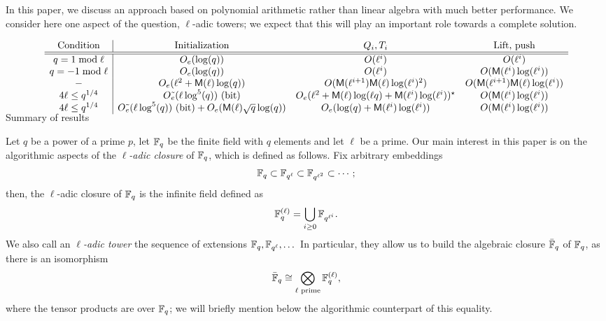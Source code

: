\documentclass{sig-alternate}
\begin{document}
In this paper, we discuss an approach based on polynomial arithmetic
rather than linear algebra with much better performance. We consider
here one aspect of the question, $\ell$-adic towers; we expect that
this will play an important role towards a complete solution.

\begin{table*}[!t]
$$
\begin{array}{c|cccc}
  \text{Condition} & \text{Initialization} & Q_i, T_i & \text{Lift, push}\\
  \hline \hline
  q = 1 \bmod \ell & O_e(\log(q))  & O(\ell^i) & O(\ell^i) \\
  q = -1 \bmod \ell & O_e(\log(q)) & O(\ell^i) & O(\Mult(\ell^i) \log(\ell^i)) \\
  - & O_e (\ell^2+\Mult(\ell) \log(q)) & O(\Mult(\ell^{i+1})\Mult(\ell)\log(\ell^i)^2) & O( \Mult(\ell^{i+1})\Mult(\ell)\log(\ell^i))\\
  4\ell \le q^{1/4} & O\tilde{_e}(\ell\log^5(q)) \text{~(bit)}  & O_e(\ell^2+\Mult(\ell)\log(\ell
  q)+\Mult(\ell^i)\log(\ell^i))^\star & O(\Mult(\ell^i) \log(\ell^i)) \\
  4\ell \le q^{1/4} & O\tilde{_e}(\ell\log^5(q))  \text{~(bit)}  + O_e(\Mult(\ell)\sqrt{q}\log(q)) & O_e(\log(q) + \Mult(\ell^i) \log(\ell^i)) & O(\Mult(\ell^i) \log(\ell^i)) \vspace{-0.5cm}
\end{array}
$$
\label{table:main}
\caption{Summary of results}
\end{table*}

Let $q$ be a power of a prime $p$, let $\mathbb{F}_q$ be the finite field with
$q$ elements and let $\ell$ be a prime. Our main interest in this
paper is on the algorithmic aspects of the \emph{$\ell$-adic closure}
of $\mathbb{F}_q$, which is defined as follows. Fix arbitrary embeddings
\begin{equation*}
  \mathbb{F}_q \subset \mathbb{F}_{q^\ell} \subset \mathbb{F}_{q^{\ell^2}} \subset \cdots;
\end{equation*}
then, the $\ell$-adic closure of $\mathbb{F}_q$ is the infinite field defined as
\begin{equation*}
  \mathbb{F}_q^{(\ell)} = \bigcup_{i\ge 0}\mathbb{F}_{q^{\ell^i}}.
\end{equation*}
We also call an \emph{$\ell$-adic tower} the sequence of extensions
$\mathbb{F}_q,\mathbb{F}_{q^\ell},\dots$ In particular, they allow us to build the
algebraic closure $\bar{\mathbb{F}}_q$ of $\mathbb{F}_q$, as there is an isomorphism
\begin{equation}
  \label{eq:tensor}
  \bar{\mathbb{F}}_q \cong \bigotimes_{\ell\text{ prime}} \mathbb{F}_q^{(\ell)},
\end{equation}
where the tensor products are over $\mathbb{F}_q$; we will briefly mention
below the algorithmic counterpart of this equality.
\end{document}
